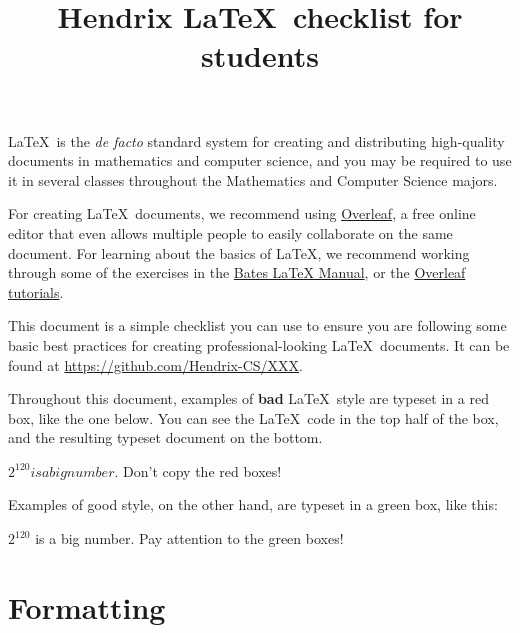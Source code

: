 \documentclass{article}
\title{Hendrix \protect\LaTeX\ checklist for students}
\begin{document}
\maketitle
\def\arraystretch{1.5}

\LaTeX\ is the \emph{de facto} standard system for creating and
distributing high-quality documents in mathematics and computer
science, and you may be required to use it in several classes
throughout the Mathematics and Computer Science majors.

For creating \LaTeX\ documents, we recommend using
\href{http://overleaf.com}{Overleaf}, a free online editor that even
allows multiple people to easily collaborate on the same document.
For learning about the basics of \LaTeX, we recommend working through
some of the exercises in the
\href{https://www.bates.edu/mathematics/resources/latex-manual/}{Bates
  LaTeX Manual}, or the \href{https://overleaf.com/learn/latex}{Overleaf
  tutorials}.

This document is a simple checklist you can use to ensure you are
following some basic best practices for creating professional-looking
\LaTeX\ documents.  It can be found at \url{https://github.com/Hendrix-CS/XXX}.

Throughout this document, examples of \textbf{bad} \LaTeX\ style are typeset in
a red box, like the one below.  You can see the \LaTeX\ code in the top half of
the box, and the resulting typeset document on the bottom.
\begin{bad}
$2^120 is a big number$.  Don't copy the red boxes!
\end{bad}

Examples of good style, on the other hand, are typeset in a green box,
like this:
\begin{good}
$2^{120}$ is a big number.  Pay attention to the green boxes!
\end{good}

\section*{Formatting}
\label{sec:formatting}
\end{document}

